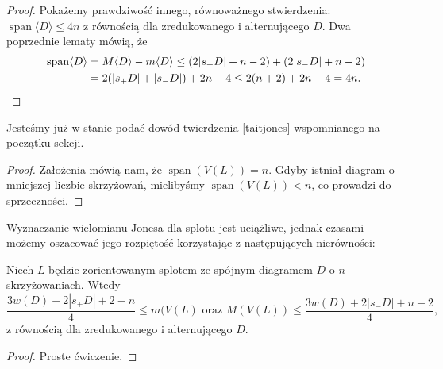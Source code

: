 \begin{proof}
Pokażemy prawdziwość innego, równoważnego stwierdzenia: $\operatorname{span} \langle D\rangle\le 4n$ z równością dla zredukowanego i alternującego $D$.
Dwa poprzednie lematy mówią, że
\begin{align*}
\operatorname{span}\langle D\rangle & = M\langle D\rangle - m\langle D\rangle \le (2|s_+D|+n-2)+(2|s_-D|+n-2) \\
& = 2(|s_+D|+|s_- D|)+2n-4 \le 2(n+2)+2n-4 = 4n. \qedhere
\end{align*}
\end{proof}

Jesteśmy już w stanie podać dowód twierdzenia \ref{taitjones} wspomnianego na początku sekcji.

\begin{proof}
Założenia mówią nam, że $\operatorname{span} (V(L)) = n$.
Gdyby istniał diagram o mniejszej liczbie skrzyżowań, mielibyśmy $\operatorname{span} (V(L)) < n$, co prowadzi do sprzeczności.
\end{proof}

Wyznaczanie wielomianu Jonesa dla splotu jest uciążliwe, jednak czasami możemy oszacować jego rozpiętość korzystając z następujących nierówności:

\begin{wniosek}
Niech $L$ będzie zorientowanym splotem ze spójnym diagramem $D$ o $n$ skrzyżowaniach. Wtedy
\[\frac{3w(D)-2|s_+D|+2-n}{4} \le m(V(L) \textrm{ oraz } M(V(L)) \le \frac{3w(D)+2|s_-D|+n-2}{4},\]
z równością dla zredukowanego i alternującego $D$.
\end{wniosek}

\begin{proof}
Proste ćwiczenie.
\end{proof}